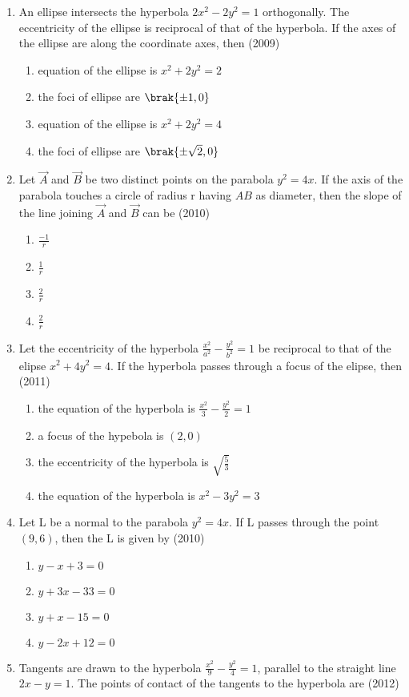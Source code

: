 \begin{enumerate}
\item An ellipse intersects the hyperbola $2x^2-2y^2=1$ orthogonally. The eccentricity of the ellipse is reciprocal of that of the hyperbola. If the axes of the ellipse are along the coordinate axes, then \hfill(2009)\\
		\begin{enumerate}
			\item equation of the ellipse is $x^2+2y^2=2$
			\item the foci of ellipse are $\brak{\pm1,0}$
			\item equation of the ellipse is $x^2+2y^2=4$
			\item the foci of ellipse are $\brak{\pm\sqrt{2},0}$
		\end{enumerate}
	\item Let $\vec{A}$ and $\vec{B}$ be two distinct points on the parabola $y^2=4x$. If
      	      the axis of the parabola touches a circle of radius r having
		$AB$ as diameter, then the slope of the line joining $\vec{A}$ and $\vec{B}$
	     can be 
		\hfill(2010)
		
		 \begin{enumerate}
			\item$\frac{-1}{r}$
			\item$\frac{1}{r}$
			\item$\frac{2}{r}$
			\item$\frac{2}{r}$
	        \end{enumerate}
	\item Let the eccentricity of the hyperbola $\frac{x^2}{a^2}-\frac{y^2}{b^2}=1$ be reciprocal to that of the elipse $x^2+4y^2=4$. If the hyperbola
	passes through a focus of the elipse, then 
		\hfill(2011)
		
		 \begin{enumerate}
			\item the equation of the hyperbola is $\frac{x^2}{3}-\frac{y^2}{2}=1$
			\item a focus of the hypebola is $(2,0)$
			\item the eccentricity of the hyperbola is $\sqrt{\frac{5}{3}}$
			\item the equation of the hyperbola is $x^2-3y^2=3$
		 \end{enumerate}
	\item Let L be a normal to the parabola $y^2=4x$. If L passes through the point $(9,6)$, then the L is given by 
		\hfill(2010)
		
		 \begin{enumerate}
			\item $y-x+3=0$
			\item $y+3x-33=0$
			\item $y+x-15=0$
			\item $y-2x+12=0$
		 \end{enumerate}
	\item Tangents are drawn to the hyperbola $\frac{x^2}{9}-\frac{y^2}{4}=1$, parallel to the straight line $2x-y=1$. The points of contact of the tangents to the hyperbola
		are  
		\hfill(2012)
		

\end{enumerate}
